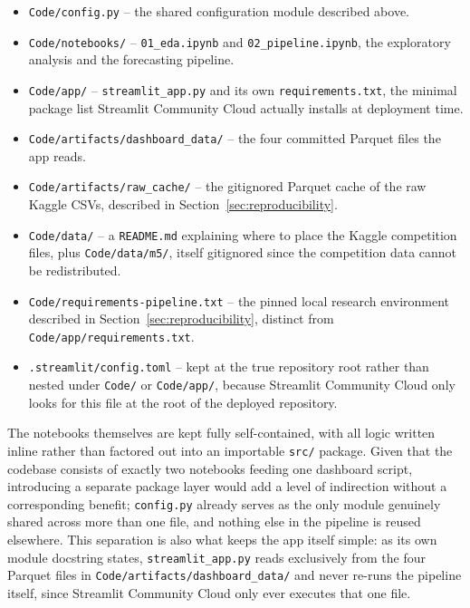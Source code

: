 \begin{itemize}
	\item \texttt{Code/config.py} -- the shared configuration module described above.
	\item \texttt{Code/notebooks/} -- \texttt{01\_eda.ipynb} and \texttt{02\_pipeline.ipynb}, the exploratory analysis and the forecasting pipeline.
	\item \texttt{Code/app/} -- \texttt{streamlit\_app.py} and its own \texttt{requirements.txt}, the minimal package list Streamlit Community Cloud actually installs at deployment time.
	\item \texttt{Code/artifacts/dashboard\_data/} -- the four committed Parquet files the app reads.
	\item \texttt{Code/artifacts/raw\_cache/} -- the gitignored Parquet cache of the raw Kaggle CSVs, described in Section~\ref{sec:reproducibility}.
	\item \texttt{Code/data/} -- a \texttt{README.md} explaining where to place the Kaggle competition files, plus \texttt{Code/data/m5/}, itself gitignored since the competition data cannot be redistributed.
	\item \texttt{Code/requirements-pipeline.txt} -- the pinned local research environment described in Section~\ref{sec:reproducibility}, distinct from \texttt{Code/app/requirements.txt}.
	\item \texttt{.streamlit/config.toml} -- kept at the true repository root rather than nested under \texttt{Code/} or \texttt{Code/app/}, because Streamlit Community Cloud only looks for this file at the root of the deployed repository.
\end{itemize}

The notebooks themselves are kept fully self-contained, with all logic written inline rather than factored out into an importable \texttt{src/} package. Given that the codebase consists of exactly two notebooks feeding one dashboard script, introducing a separate package layer would add a level of indirection without a corresponding benefit; \texttt{config.py} already serves as the only module genuinely shared across more than one file, and nothing else in the pipeline is reused elsewhere. This separation is also what keeps the app itself simple: as its own module docstring states, \texttt{streamlit\_app.py} reads exclusively from the four Parquet files in \texttt{Code/artifacts/dashboard\_data/} and never re-runs the pipeline itself, since Streamlit Community Cloud only ever executes that one file.